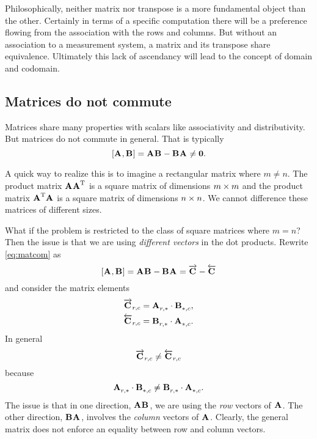 Philosophically, neither matrix nor transpose is a more fundamental object than the other. Certainly in terms of a specific computation there will be a preference flowing from the association with the rows and columns. But without an association to a measurement system, a matrix and its transpose share equivalence. Ultimately this lack of ascendancy will lead to the concept of domain and codomain.

\subsection{Matrices do not commute}
Matrices share many properties with scalars like associativity and distributivity. But matrices do not commute in general. That is typically
\begin{equation}
  \left[ \textbf{A}^{\mathrm{}},\textbf{B}^{\mathrm{}} \right] = \textbf{A}^{\mathrm{}}\textbf{B}^{\mathrm{}}-\textbf{B}^{\mathrm{}}\textbf{A}^{\mathrm{}} \ne \textbf{0}.
  \label{eq:matcom}
\end{equation}

A quick way to realize this is to imagine a rectangular matrix where $m\ne n$. The product matrix $\textbf{A}^{\mathrm{}}\textbf{A}^{\mathrm{T}}$ is a square matrix of dimensions $m \times m$ and the product matrix $\textbf{A}^{\mathrm{T}}\textbf{A}^{\mathrm{}}$ is a square matrix of dimensions $n \times n$. We cannot difference these matrices of different sizes.

What if the problem is restricted to the class of square matrices where $m=n$? Then the issue is that we are using \textit{different vectors} in the dot products. Rewrite \eqref{eq:matcom} as 
\begin{equation}
  \left[ \textbf{A}^{\mathrm{}},\textbf{B}^{\mathrm{}} \right] = \textbf{A}^{\mathrm{}}\textbf{B}^{\mathrm{}}-\textbf{B}^{\mathrm{}}\textbf{A}^{\mathrm{}} = \overrightarrow{\textbf{C}^{\mathrm{}}} - \overleftarrow{\textbf{C}^{\mathrm{}}}
\end{equation}
and consider the matrix elements 
\begin{equation}
  \begin{split}
    \overrightarrow{\textbf{C}^{\mathrm{}}}_{r,c} &= \textbf{A}^{\mathrm{}}_{r,*}\cdot\textbf{B}^{\mathrm{}}_{*,c},\\
    \overleftarrow{\textbf{C}^{\mathrm{}}}_{r,c} &= \textbf{B}^{\mathrm{}}_{r,*}\cdot\textbf{A}^{\mathrm{}}_{*,c}.\\
  \end{split}
\end{equation}
In general
\begin{equation}
   \overrightarrow{\textbf{C}^{\mathrm{}}}_{r,c} \ne \overleftarrow{\textbf{C}^{\mathrm{}}}_{r,c}
\end{equation}
because
\begin{equation}
  \textbf{A}^{\mathrm{}}_{r,*}\cdot\textbf{B}^{\mathrm{}}_{*,c} \ne \textbf{B}^{\mathrm{}}_{r,*}\cdot\textbf{A}^{\mathrm{}}_{*,c}.
\end{equation}
The issue is that in one direction, $\textbf{A}^{\mathrm{}}\textbf{B}^{\mathrm{}}$, we are using the \textit{row} vectors of $\textbf{A}^{\mathrm{}}$. The other direction, $\textbf{B}^{\mathrm{}}\textbf{A}^{\mathrm{}}$, involves the \textit{column} vectors of $\textbf{A}^{\mathrm{}}$. Clearly, the general matrix does not enforce an equality between row and column vectors.

